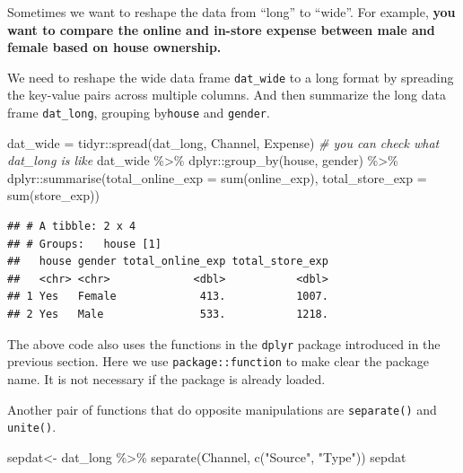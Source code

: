 \documentclass[
  12pt,
]{krantz}
\makeatletter
\newenvironment{Shaded}{\begin{snugshade}}{\end{snugshade}}
\newcommand{\AttributeTok}[1]{\textcolor[rgb]{0.61,0.61,0.61}{#1}}
\newcommand{\CommentTok}[1]{\textcolor[rgb]{0.37,0.37,0.37}{\textit{#1}}}
\newcommand{\FunctionTok}[1]{\textcolor[rgb]{0,0,0}{#1}}
\newcommand{\NormalTok}[1]{#1}
\newcommand{\OtherTok}[1]{\textcolor[rgb]{0.37,0.37,0.37}{#1}}
\newcommand{\SpecialCharTok}[1]{\textcolor[rgb]{0,0,0}{#1}}
\newcommand{\StringTok}[1]{\textcolor[rgb]{0.5,0.5,0.5}{#1}}
\newenvironment{kframe}{%
\medskip{}
\setlength{\fboxsep}{.8em}
 \def\at@end@of@kframe{}%
 \ifinner\ifhmode%
  \def\at@end@of@kframe{\end{minipage}}%
  \begin{minipage}{\columnwidth}%
 \fi\fi%
 \def\FrameCommand##1{\hskip\@totalleftmargin \hskip-\fboxsep
 \colorbox{shadecolor}{##1}\hskip-\fboxsep
     \hskip-\linewidth \hskip-\@totalleftmargin \hskip\columnwidth}%
 \MakeFramed {\advance\hsize-\width
   \@totalleftmargin\z@ \linewidth\hsize
   \@setminipage}}%
 {\par\unskip\endMakeFramed%
 \at@end@of@kframe}
\renewenvironment{Shaded}{\begin{kframe}}{\end{kframe}}
\makeatother
\begin{document}
Sometimes we want to reshape the data from ``long'' to ``wide''. For example, \textbf{you want to compare the online and in-store expense between male and female based on house ownership.}

We need to reshape the wide data frame \texttt{dat\_wide} to a long format by spreading the key-value pairs across multiple columns. And then summarize the long data frame \texttt{dat\_long}, grouping by\texttt{house} and \texttt{gender}.

\begin{Shaded}
\begin{Highlighting}[]
\NormalTok{dat\_wide }\OtherTok{=}\NormalTok{ tidyr}\SpecialCharTok{::}\FunctionTok{spread}\NormalTok{(dat\_long, Channel, Expense)}
\CommentTok{\# you can check what dat\_long is like}
\NormalTok{dat\_wide }\SpecialCharTok{\%\textgreater{}\%} 
\NormalTok{  dplyr}\SpecialCharTok{::}\FunctionTok{group\_by}\NormalTok{(house, gender) }\SpecialCharTok{\%\textgreater{}\%} 
\NormalTok{  dplyr}\SpecialCharTok{::}\FunctionTok{summarise}\NormalTok{(}\AttributeTok{total\_online\_exp =} \FunctionTok{sum}\NormalTok{(online\_exp),}
                   \AttributeTok{total\_store\_exp =} \FunctionTok{sum}\NormalTok{(store\_exp))}
\end{Highlighting}
\end{Shaded}

\begin{verbatim}
## # A tibble: 2 x 4
## # Groups:   house [1]
##   house gender total_online_exp total_store_exp
##   <chr> <chr>             <dbl>           <dbl>
## 1 Yes   Female             413.           1007.
## 2 Yes   Male               533.           1218.
\end{verbatim}

The above code also uses the functions in the \texttt{dplyr} package introduced in the previous section. Here we use \texttt{package::function} to make clear the package name. It is not necessary if the package is already loaded.

Another pair of functions that do opposite manipulations are \texttt{separate()} and \texttt{unite()}.

\begin{Shaded}
\begin{Highlighting}[]
\NormalTok{sepdat}\OtherTok{\textless{}{-}}\NormalTok{ dat\_long }\SpecialCharTok{\%\textgreater{}\%} 
  \FunctionTok{separate}\NormalTok{(Channel, }\FunctionTok{c}\NormalTok{(}\StringTok{"Source"}\NormalTok{, }\StringTok{"Type"}\NormalTok{))}
\NormalTok{sepdat}
\end{Highlighting}
\end{Shaded}
\end{document}
